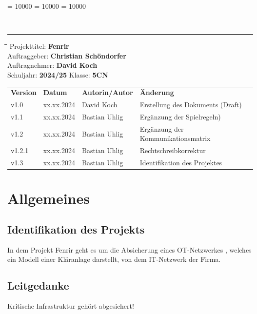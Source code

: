 \documentclass[
	headings=optiontotocandhead,%
	oneside,
	numbers=noenddot,%
	toc=flat, %
	10pt, %
	parskip=full, %
	listof=totoc, %
	listof=flat, %
	numbers=noenddot, %
	bibliography=totoc, %
	a4paper,DIV=14,
]{scrartcl}
\newcommand\Tstrut{\rule{0pt}{3.2ex}}         %
\newcommand\Bstrut{\rule[-1.5ex]{0pt}{0pt}}   %
\newenvironment{nstabbing}
	{\setlength{\topsep}{-\parskip}
		\setlength{\partopsep}{-\parskip}
		\tabbing}
	{\endtabbing}
\begin{document}
\clubpenalty = 10000 %
\widowpenalty = 10000 %
\displaywidowpenalty = 10000

{\sffamily{\textbf{\LARGE{\textcolor{orange}{Spielregeln}}}}}\\
\noindent\rule{\textwidth}{0.1pt}
\begin{nstabbing}
	\hspace{4cm}\=\hspace{4cm}\=\hspace{4cm}\=\kill
	Projekttitel: \> \textbf{Fenrir}\\
	Auftraggeber: \> \textbf{Christian Schöndorfer}\\
	Auftragnehmer: \> \textbf{David Koch}\\
	Schuljahr: \> \textbf{2024/25}
	\> Klasse: \> \textbf{5CN}\\
\end{nstabbing}
{\smaller
	\begin{tabularx}{\textwidth}{l l l l}
	\hline
	\textbf{Version} & \textbf{Datum} & \textbf{Autorin/Autor} & \textbf{Änderung}\Tstrut  \\
	v1.0 & xx.xx.2024 & David Koch & Erstellung des Dokuments (Draft)\Tstrut  \\
	v1.1 & xx.xx.2024 & Bastian Uhlig & Ergänzung der Spielregeln)\Tstrut  \\
	v1.2 & xx.xx.2024 & Bastian Uhlig & Ergänzung der Kommunikationsmatrix \\
	v1.2.1 & xx.xx.2024 & Bastian Uhlig & Rechtschreibkorrektur \Tstrut \\
	v1.3 & xx.xx.2024 & Bastian Uhlig & Identifikation des Projektes \Bstrut \\
	\hline
	\end{tabularx}
}

\section{Allgemeines}
\subsection{Identifikation des Projekts}
In dem Projekt Fenrir geht es um die Absicherung eines OT-Netzwerkes , welches ein Modell einer Kläranlage darstellt, von dem IT-Netzwerk der Firma. 
\subsection{Leitgedanke}
Kritische Infrastruktur gehört abgesichert!
\end{document}
